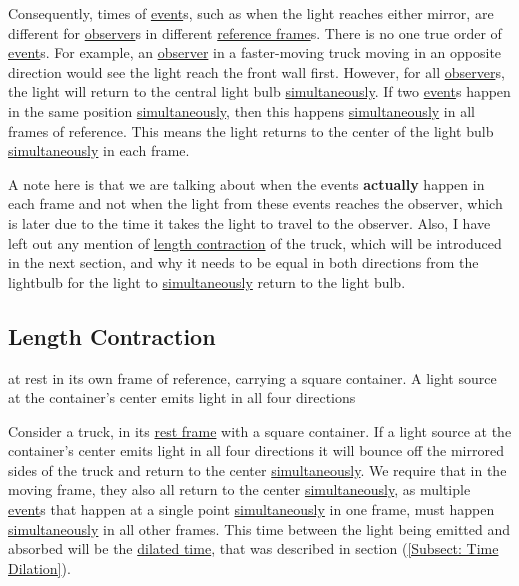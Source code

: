 Consequently, times of \hyperlink{def-event}{event}s, such as when the light reaches either mirror, are different for \hyperlink{def-observer}{observer}s in different \hyperlink{def-Reference-frame}{reference frame}s.
There is no one true order of \hyperlink{def-event}{event}s.
For example, an \hyperlink{def-observer}{observer} in a faster-moving truck moving in an opposite direction would see the light reach the front wall first.
However, for all \hyperlink{def-observer}{observer}s, the light will return to the central light bulb \hyperlink{def-simultaneity}{simultaneously}.
If two \hyperlink{def-event}{event}s happen in the same position \hyperlink{def-simultaneity}{simultaneously}, then this happens \hyperlink{def-simultaneity}{simultaneously} in all frames of reference.
This means the light returns to the center of the light bulb \hyperlink{def-simultaneity}{simultaneously} in each frame.

A note here is that we are talking about when the events \textbf{actually} happen in each frame and not when the light from these events reaches the observer, which is later due to the time it takes the light to travel to the observer.
Also, I have left out any mention of \hyperlink{def-length-contraction}{length contraction} of the truck, which will be introduced in the next section, and why it needs to be equal in both directions from the lightbulb for the light to \hyperlink{def-simultaneity}{simultaneously} return to the light bulb.

\subsection{Length Contraction} \label{subsect: Length Contraction}

at rest in its own frame of reference, carrying a square container. A light source at the container's center emits light in all four directions

Consider a truck, in its \hyperlink{def-proper-frame}{rest frame} with a square container.
If a light source at the container's center emits light in all four directions it will bounce off the mirrored sides of the truck and return to the center \hyperlink{def-simultaneity}{simultaneously}.
We require that in the moving frame, they also all return to the center \hyperlink{def-simultaneity}{simultaneously}, as multiple \hyperlink{def-event}{event}s that happen at a single point \hyperlink{def-simultaneity}{simultaneously} in one frame, must happen \hyperlink{def-simultaneity}{simultaneously} in all other frames.
This time between the light being emitted and absorbed will be the \hyperlink{def-time-dilation}{dilated time}, that was described in section (\ref{Subsect: Time Dilation}).

